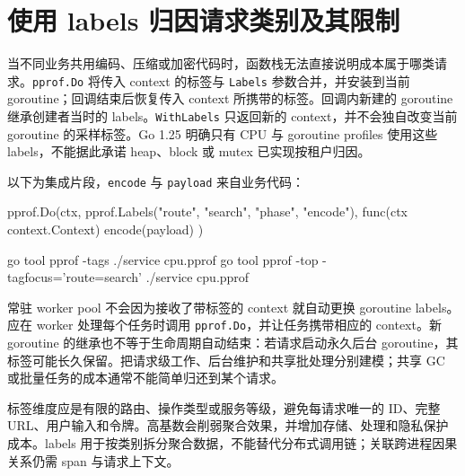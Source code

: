 \documentclass[UTF8,fontset=fandol,openany,11pt]{ctexbook}
\begin{document}
\section{使用 labels 归因请求类别及其限制}
当不同业务共用编码、压缩或加密代码时，函数栈无法直接说明成本属于哪类请求。\texttt{pprof.\allowbreak{}Do} 将传入 context 的标签与 \texttt{Labels} 参数合并，并安装到当前 goroutine；回调结束后恢复传入 context 所携带的标签。回调内新建的 goroutine 继承创建者当时的 labels。\texttt{WithLabels} 只返回新的 context，并不会独自改变当前 goroutine 的采样标签。Go 1.25 明确只有 CPU 与 goroutine profiles 使用这些 labels，不能据此承诺 heap、block 或 mutex 已实现按租户归因。\cite{tools-labels}\cite{tools-label-runtime}

以下为集成片段，\texttt{encode} 与 \texttt{payload} 来自业务代码：

\begin{codeblock}
pprof.Do(ctx, pprof.Labels("route", "search", "phase", "encode"),
    func(ctx context.Context) {
        encode(payload)
    })
\end{codeblock}

\begin{codeblock}
go tool pprof -tags ./service cpu.pprof
go tool pprof -top -tagfocus='route=search' ./service cpu.pprof
\end{codeblock}

常驻 worker pool 不会因为接收了带标签的 context 就自动更换 goroutine labels。应在 worker 处理每个任务时调用 \texttt{pprof.\allowbreak{}Do}，并让任务携带相应的 context。新 goroutine 的继承也不等于生命周期自动结束：若请求启动永久后台 goroutine，其标签可能长久保留。把请求级工作、后台维护和共享批处理分别建模；共享 GC 或批量任务的成本通常不能简单归还到某个请求。

标签维度应是有限的路由、操作类型或服务等级，避免每请求唯一的 ID、完整 URL、用户输入和令牌。高基数会削弱聚合效果，并增加存储、处理和隐私保护成本。labels 用于按类别拆分聚合数据，不能替代分布式调用链；关联跨进程因果关系仍需 span 与请求上下文。
\end{document}
